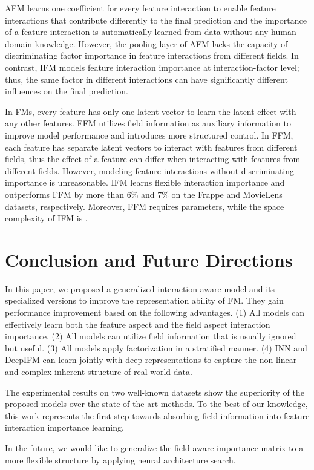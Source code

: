 \documentclass[letterpaper]{article} \usepackage{aaai19}  \usepackage{times}  \usepackage{helvet}  \usepackage{courier}  \usepackage{url}  \usepackage{graphicx}  \frenchspacing  \setlength{\pdfpagewidth}{8.5in}  \setlength{\pdfpageheight}{11in}  \usepackage{mathtools}
\begin{document}
AFM learns one coefficient for every feature interaction to enable feature interactions that contribute differently to the final prediction and the importance of a feature interaction is automatically learned from data without any human domain knowledge.
However, the pooling layer of AFM lacks the capacity of discriminating factor importance in feature interactions from different fields. In contrast, IFM models feature interaction importance at interaction-factor level; thus, the same factor in different interactions can have significantly different influences on the final prediction.

In FMs, every feature has only one latent vector to learn the latent effect with any other features. FFM utilizes field information as auxiliary information to improve model performance and introduces more structured control. In FFM, each feature has separate latent vectors to interact with features from different fields, thus the effect of a feature can differ when interacting with features from different fields. 
However, modeling feature interactions without discriminating importance is unreasonable. IFM learns flexible interaction importance and outperforms FFM by more than 6\% and 7\% on the Frappe and MovieLens datasets, respectively. Moreover, FFM requires  parameters, while the space complexity of IFM is .

\section{Conclusion and Future Directions}


In this paper, we proposed a generalized interaction-aware model and its specialized versions to improve the representation ability of FM. They gain performance improvement based on the following advantages. (1) All models can effectively learn both the feature aspect and the field aspect interaction importance. (2) All models can utilize field information that is usually ignored but useful. (3) All models apply factorization in a stratified manner. (4) INN and DeepIFM can learn jointly with deep representations to capture the non-linear and complex inherent structure of real-world data.

The experimental results on two well-known datasets show the superiority of the proposed models over the state-of-the-art methods.
To the best of our knowledge, this work represents the first step towards absorbing field information into feature interaction importance learning.

In the future, we would like to generalize the field-aware importance matrix to a more flexible structure by applying neural architecture search\cite{liu2017progressive}.
\end{document}
